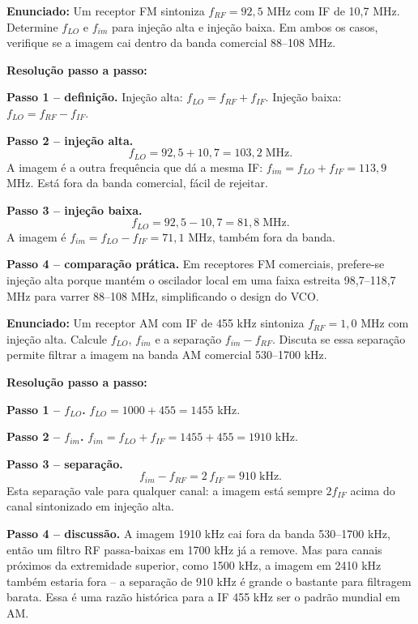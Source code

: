 \documentclass[11pt,a4paper]{article}
\begin{document}
\begin{exercicio}
\textbf{Enunciado:} Um receptor FM sintoniza $f_{RF}=92{,}5$ MHz com IF de 10,7 MHz. Determine $f_{LO}$ e $f_{im}$ para injeção alta e injeção baixa. Em ambos os casos, verifique se a imagem cai dentro da banda comercial 88--108 MHz.

\textbf{Resolução passo a passo:}

\textbf{Passo 1 -- definição.}
Injeção alta: $f_{LO} = f_{RF}+f_{IF}$. Injeção baixa: $f_{LO}=f_{RF}-f_{IF}$.

\textbf{Passo 2 -- injeção alta.}
\[
  f_{LO} = 92{,}5 + 10{,}7 = 103{,}2\;\text{MHz}.
\]
A imagem é a outra frequência que dá a mesma IF: $f_{im} = f_{LO}+f_{IF} = 113{,}9$ MHz. Está fora da banda comercial, fácil de rejeitar.

\textbf{Passo 3 -- injeção baixa.}
\[
  f_{LO} = 92{,}5 - 10{,}7 = 81{,}8\;\text{MHz}.
\]
A imagem é $f_{im} = f_{LO}-f_{IF} = 71{,}1$ MHz, também fora da banda.

\textbf{Passo 4 -- comparação prática.}
Em receptores FM comerciais, prefere-se injeção alta porque mantém o oscilador local em uma faixa estreita 98,7--118,7 MHz para varrer 88--108 MHz, simplificando o design do VCO.
\end{exercicio}

\begin{exercicio}
\textbf{Enunciado:} Um receptor AM com IF de 455 kHz sintoniza $f_{RF}=1{,}0$ MHz com injeção alta. Calcule $f_{LO}$, $f_{im}$ e a separação $f_{im}-f_{RF}$. Discuta se essa separação permite filtrar a imagem na banda AM comercial 530--1700 kHz.

\textbf{Resolução passo a passo:}

\textbf{Passo 1 -- $f_{LO}$.}
$f_{LO} = 1000 + 455 = 1455$ kHz.

\textbf{Passo 2 -- $f_{im}$.}
$f_{im} = f_{LO} + f_{IF} = 1455 + 455 = 1910$ kHz.

\textbf{Passo 3 -- separação.}
\[
  f_{im} - f_{RF} = 2\,f_{IF} = 910\;\text{kHz}.
\]
Esta separação vale para qualquer canal: a imagem está sempre $2 f_{IF}$ acima do canal sintonizado em injeção alta.

\textbf{Passo 4 -- discussão.}
A imagem 1910 kHz cai fora da banda 530--1700 kHz, então um filtro RF passa-baixas em 1700 kHz já a remove. Mas para canais próximos da extremidade superior, como 1500 kHz, a imagem em 2410 kHz também estaria fora -- a separação de 910 kHz é grande o bastante para filtragem barata. Essa é uma razão histórica para a IF 455 kHz ser o padrão mundial em AM.
\end{exercicio}
\end{document}
